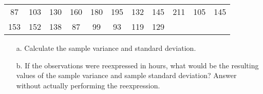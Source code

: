 \documentclass[letterpaper,12pt]{article}
\begin{document}
\begin{enumerate}
    \begin{center}
      \begin{tabular}{*{11}{S[table-format=3.0]}}
        87 & 103 & 130 & 160 & 180 & 195 & 132 & 145 & 211 & 105 & 145 \\
        153 & 152 & 138 & 87 & 99 & 93 & 119 & 129
      \end{tabular}
    \end{center}
    \begin{enumerate}
      \item[a.]
        Calculate the sample variance and standard deviation.
      \item[b.]
        If the observations were reexpressed in hours, what would be the resulting values of the sample variance and sample standard deviation? Answer without actually performing the reexpression.
    \end{enumerate}
\end{enumerate}
\end{document}
